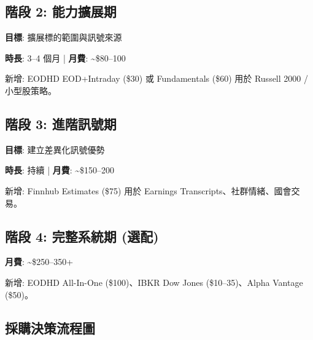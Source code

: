 \documentclass[11pt,a4paper]{article}
\begin{document}
\subsection*{階段 2: 能力擴展期}

\textbf{目標}: 擴展標的範圍與訊號來源

\textbf{時長}: 3--4 個月 | \textbf{月費}: \textasciitilde\$80--100

新增: EODHD EOD+Intraday (\$30) 或 Fundamentals (\$60) 用於 Russell 2000 / 小型股策略。

\subsection*{階段 3: 進階訊號期}

\textbf{目標}: 建立差異化訊號優勢

\textbf{時長}: 持續 | \textbf{月費}: \textasciitilde\$150--200

新增: Finnhub Estimates (\$75) 用於 Earnings Transcripts、社群情緒、國會交易。

\subsection*{階段 4: 完整系統期 (選配)}

\textbf{月費}: \textasciitilde\$250--350+

新增: EODHD All-In-One (\$100)、IBKR Dow Jones (\$10--35)、Alpha Vantage (\$50)。

\subsection*{採購決策流程圖}
\end{document}
